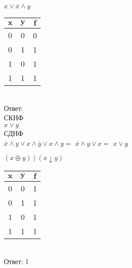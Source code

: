     \begin{minipage}[t]{0.3\textwidth}
        \begin{enumerate}
            \setcounter{enumi}{3}
            \begin{spacing}{0.5}
                \item $x \vee \overline x \wedge y$\\
            \end{spacing}
            \begin{tabular}{|c|c|c|}
                \hline
                $\textbf{x}$ & $\textbf{y}$ & $\textbf{f}$ \\
                \hline
                \hline
                0            & 0            & 0            \\
                \hline
                0            & 1            & 1            \\
                \hline
                1            & 0            & 1            \\
                \hline
                1            & 1            & 1            \\
                \hline
            \end{tabular}\\
            Ответ:\\
            СКНФ\\
            $x \vee y$\\
            СДНФ\\
            $\overline x \wedge y \vee x \wedge \overline y \vee x \wedge y = $
            $\overline x \wedge y \vee x = $
            $x \vee y$
            \setcounter{enumi}{7}
            \begin{spacing}{0.5}
                \item $(x \oplus y) \mid (x \downarrow y)$\\
            \end{spacing}
            \begin{tabular}{|c|c|c|}
                \hline
                $\textbf{x}$ & $\textbf{y}$ & $\textbf{f}$ \\
                \hline
                \hline
                0            & 0            & 1            \\
                \hline
                0            & 1            & 1            \\
                \hline
                1            & 0            & 1            \\
                \hline
                1            & 1            & 1            \\
                \hline
            \end{tabular}\\
            Ответ: 1
        \end{enumerate}
    \end{minipage}


